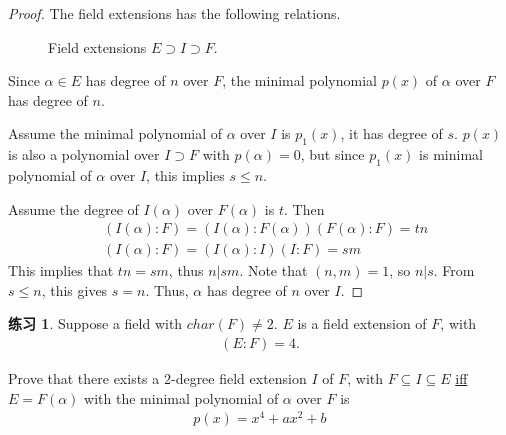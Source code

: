 \documentclass[utf8]{ctexbook}
\theoremstyle{definition}
\newtheorem{exercise}{练习}[section]
\begin{document}
\begin{proof}

The field extensions has the following relations.

\begin{figure}[ht!]
\begin{center}
\end{center}
\caption{Field extensions $E \supset I \supset F$.}
\end{figure}

Since $\alpha \in E$ has degree of $n$ over $F$, the minimal polynomial $p(x)$ of $\alpha$ over $F$ has degree of $n$.

Assume the minimal polynomial of $\alpha$ over $I$ is $p_1 (x)$, it has degree of $s$. $p(x)$ is also a polynomial over $I \supset F$ with $p(\alpha)=0$, but since $p_1(x)$ is minimal polynomial of $\alpha$ over $I$, this implies $s \leq n$. 

Assume the degree of $I(\alpha)$ over $F(\alpha)$ is $t$. Then
\begin{align*}
& (I(\alpha) : F) = (I(\alpha) : F(\alpha) ) (F(\alpha): F) = t n \\
& (I(\alpha) : F) = (I(\alpha) : I) (I: F) = sm
\end{align*}
This implies that $tn = sm$, thus $n | sm$. Note that $(n,m)=1$, so $n |s$. From $s \leq n$, this gives $s = n$. Thus, $\alpha$ has degree of $n$ over $I$. 

\end{proof}



\begin{exercise}
Suppose a field with $char(F) \neq 2$. $E$ is a field extension of $F$, with
\begin{align*}
(E:F) = 4 .
\end{align*}

Prove that there exists a $2$-degree field extension $I$ of $F$, with $F \subseteq I \subseteq E$ \underline{iff} $E=F(\alpha)$ with the minimal polynomial of $\alpha$ over $F$ is
\begin{align*}
p(x) = x^4 + ax^2 + b
\end{align*}

\end{exercise}
\end{document}
